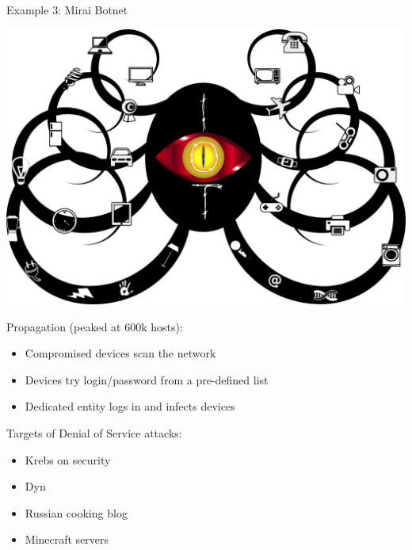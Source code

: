 \begin{frame}{Example 3: Mirai Botnet~\cite{antonakakis2017understanding}}

    \begin{center}
        \includegraphics[scale=0.1]{Figures/Miurai_octopus.png}
    \end{center}
    
    Propagation (peaked at 600k hosts):
    \begin{itemize}
        \item Compromised devices scan the network
        \item Devices try login/password from a pre-defined list
        \item Dedicated entity logs in and infects devices
    \end{itemize}
    
    \bigskip
    Targets of Denial of Service attacks:
    \vspace{-3mm}
    \begin{multicols}{2}
        \begin{itemize}
            \item Krebs on security
            \item Dyn
            \item Russian cooking blog
            \item Minecraft servers
        \end{itemize}        
    \end{multicols}
    
\end{frame}

